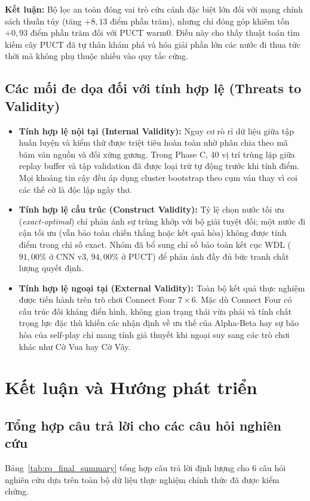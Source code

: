 \documentclass[11pt, a4paper]{article}
\begin{document}
\textbf{Kết luận:} Bộ lọc an toàn đóng vai trò cứu cánh đặc biệt lớn đối với mạng chính sách thuần túy (tăng $+8{,}13$ điểm phần trăm), nhưng chỉ đóng góp khiêm tốn $+0{,}93$ điểm phần trăm đối với PUCT warm0. Điều này cho thấy thuật toán tìm kiếm cây PUCT đã tự thân khám phá và hóa giải phần lớn các nước đi thua tức thời mà không phụ thuộc nhiều vào quy tắc cứng.

\subsection{Các mối đe dọa đối với tính hợp lệ (Threats to Validity)}
\begin{itemize}
    \item \textbf{Tính hợp lệ nội tại (Internal Validity):} Nguy cơ rò rỉ dữ liệu giữa tập huấn luyện và kiểm thử được triệt tiêu hoàn toàn nhờ phân chia theo mã băm ván nguồn và đối xứng gương. Trong Phase C, 40 vị trí trùng lặp giữa replay buffer và tập validation đã được loại trừ tự động trước khi tính điểm. Mọi khoảng tin cậy đều áp dụng cluster bootstrap theo cụm ván thay vì coi các thế cờ là độc lập ngây thơ.
    \item \textbf{Tính hợp lệ cấu trúc (Construct Validity):} Tỷ lệ chọn nước tối ưu (\textit{exact-optimal}) chỉ phản ánh sự trùng khớp với bộ giải tuyệt đối; một nước đi cận tối ưu (vẫn bảo toàn chiến thắng hoặc kết quả hòa) không được tính điểm trong chỉ số exact. Nhóm đã bổ sung chỉ số bảo toàn kết cục WDL ($91{,}00\%$ ở CNN v3, $94{,}00\%$ ở PUCT) để phản ánh đầy đủ bức tranh chất lượng quyết định.
    \item \textbf{Tính hợp lệ ngoại tại (External Validity):} Toàn bộ kết quả thực nghiệm được tiến hành trên trò chơi Connect Four $7 \times 6$. Mặc dù Connect Four có cấu trúc đối kháng điển hình, không gian trạng thái vừa phải và tính chất trọng lực đặc thù khiến các nhận định về ưu thế của Alpha-Beta hay sự bão hòa của self-play chỉ mang tính giả thuyết khi ngoại suy sang các trò chơi khác như Cờ Vua hay Cờ Vây.
\end{itemize}

\section{Kết luận và Hướng phát triển}

\subsection{Tổng hợp câu trả lời cho các câu hỏi nghiên cứu}
Bảng~\ref{tab:rq_final_summary} tổng hợp câu trả lời định lượng cho 6 câu hỏi nghiên cứu dựa trên toàn bộ dữ liệu thực nghiệm chính thức đã được kiểm chứng.
\end{document}
